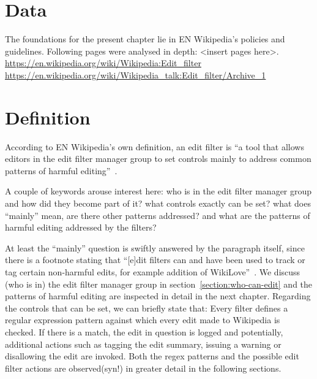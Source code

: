 \section{Data}

The foundations for the present chapter lie in EN Wikipedia's policies and guidelines.
Following pages were analysed in depth: <insert pages here>.
\url{https://en.wikipedia.org/wiki/Wikipedia:Edit_filter}
\url{https://en.wikipedia.org/wiki/Wikipedia_talk:Edit_filter/Archive_1}

\section{Definition}

According to EN Wikipedia's own definition, an edit filter is ``a tool that allows editors in the edit filter manager group to set controls mainly to address common patterns of harmful editing''~\cite{Wikipedia:EditFilter}.

A couple of keywords arouse interest here:
who is in the edit filter manager group and how did they become part of it? what controls exactly can be set? what does ``mainly'' mean, are there other patterns addressed? and what are the patterns of harmful editing addressed by the filters?

At least the ``mainly'' question is swiftly answered by the paragraph itself, since there is a footnote stating that ``[e]dit filters can and have been used to track or tag certain non-harmful edits, for example addition of WikiLove''~\cite{Wikipedia:EditFilter}.
We discuss (who is in) the edit filter manager group in section~\ref{section:who-can-edit} and the patterns of harmful editing are inspected in detail in the next chapter.
Regarding the controls that can be set, we can briefly state that:
Every filter defines a regular expression pattern against which every edit made to Wikipedia is checked.
If there is a match, the edit in question is logged and potentially, additional actions such as tagging the edit summary, issuing a warning or disallowing the edit are invoked.
Both the regex patterns and the possible edit filter actions are observed(syn!) in greater detail in the following sections.


